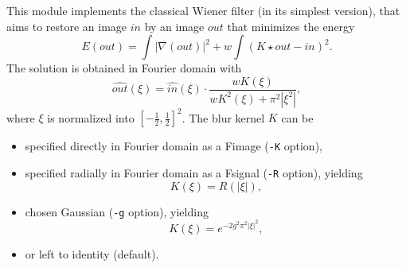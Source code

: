 This module implements the classical Wiener filter (in its simplest version),
that aims to restore an image $in$ by an image $out$ that minimizes
the energy
$$E(out) = \int |\nabla(out)|^2 +  w \int (K \star out -in)^2.$$
The solution is obtained in Fourier domain with
$$\widehat{out}(\xi) = \widehat{in}(\xi) \cdot
\frac{w K(\xi)}{w K^2(\xi) + \pi^2|\xi^2|},$$
where $\xi$ is normalized into $[-\frac 12,\frac 12]^2$.
The blur kernel $K$ can be 
\begin{itemize}
\item specified directly in Fourier domain as a Fimage (\verb+-K+ option), 
\item specified radially in Fourier domain as a Fsignal (\verb+-R+ option), yielding
$$K(\xi) = R(|\xi|),$$
\item chosen Gaussian (\verb+-g+ option), yielding
$$K(\xi) = e^{-2g^2\pi^2|\xi|^2},$$ 
\item or left to identity (default).
\end{itemize}
